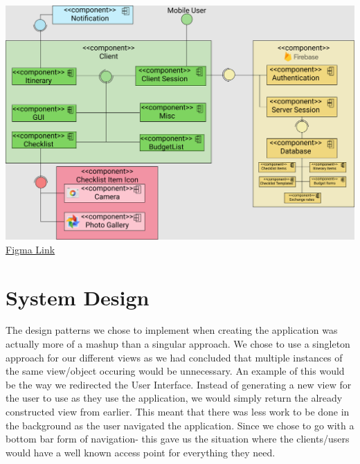 \documentclass[12pt]{article}
\begin{document}
	\pagebreak
	\includegraphics[angle=270,scale=0.4]{Trip-Ease Component Diagram.png}
	\linebreak
	\href{https://www.figma.com/file/VlRhkIKiCqkBc3qPGubwtc/Trip-Ease-Component-Diagram}{Figma Link}
	\pagebreak
	\section*{System Design}

	The design patterns we chose to implement when creating the application was actually more of a mashup than a singular approach. We chose to use a singleton approach
	for our different views as we had concluded that multiple instances of the same view/object occuring would be unnecessary. An example of this would be the way we redirected
	the User Interface. Instead of generating a new view for the user to use as they use the application, we would simply return the already constructed view from earlier.
	This meant that there was less work to be done in the background as the user navigated the application. Since we chose to go with a bottom bar form of navigation-
	this gave us the situation where the clients/users would have a well known access point for everything they need.
\end{document}

